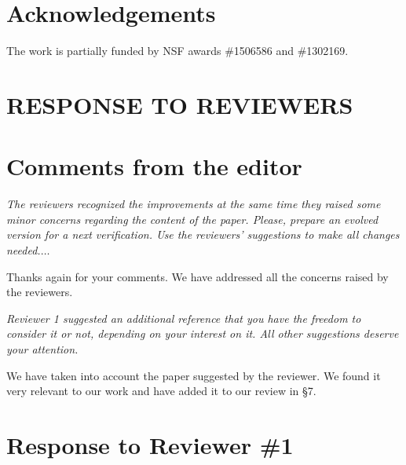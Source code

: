 \documentclass[twocolumn,5p]{elsarticle}
\newcommand{\review}[1]{\noindent\textit{#1\\}}
\theoremstyle{break}
\begin{document}
	
	\section*{Acknowledgements}
	The work is partially funded by NSF  awards \#1506586 and \#1302169.
	
	\balance
	
	

	
	
	
	
	\pagebreak
	\newpage
	\appendix
	\renewcommand*{\thesection}{\Alph{section}}
	\nobalance
	\section*{RESPONSE TO REVIEWERS}
	\section*{Comments from the editor}
	\review{The reviewers recognized the improvements at the same time they 
	raised some minor concerns regarding the content of the paper. Please, 
	prepare an evolved version for a next verification. Use the reviewers' 
	suggestions to make all changes needed.$\ldots$}
	
	Thanks again for your comments. We have addressed all the concerns raised 
	by the reviewers.
	
	\review{Reviewer 1 suggested an additional reference that you have the 
	freedom to 
	consider it or not, depending on your interest on it. All other suggestions 
	deserve your attention. }
	
	We have taken into account the paper suggested by the reviewer. We found it 
	very relevant to our work and have added it to our review in \S7. 
	
	\section*{Response to Reviewer \#1}
	
\end{document}
